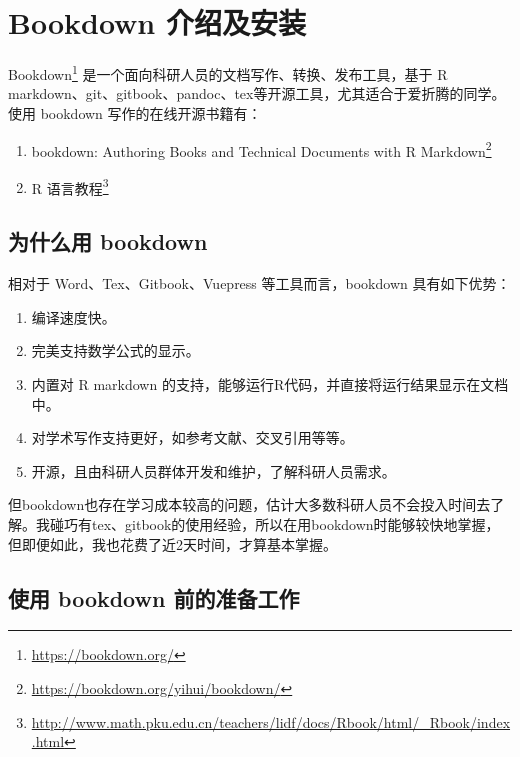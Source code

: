 \documentclass[]{ctexbook}
\providecommand{\tightlist}{%
  \setlength{\itemsep}{0pt}\setlength{\parskip}{0pt}}
\renewcommand{\href}[2]{#2\footnote{\url{#1}}}
\begin{document}
\mainmatter

\hypertarget{intro}{%
\chapter{Bookdown 介绍及安装}\label{intro}}

\href{https://bookdown.org/}{Bookdown} 是一个面向科研人员的文档写作、转换、发布工具，基于 R markdown、git、gitbook、pandoc、tex等开源工具，尤其适合于爱折腾的同学。使用 bookdown 写作的在线开源书籍有：

\begin{enumerate}
\def\labelenumi{\arabic{enumi}.}
\tightlist
\item
  \href{https://bookdown.org/yihui/bookdown/}{bookdown: Authoring Books and Technical Documents with R Markdown}
\item
  \href{http://www.math.pku.edu.cn/teachers/lidf/docs/Rbook/html/_Rbook/index.html}{R 语言教程}
\end{enumerate}

\hypertarget{ux4e3aux4ec0ux4e48ux7528-bookdown}{%
\section{为什么用 bookdown}\label{ux4e3aux4ec0ux4e48ux7528-bookdown}}

相对于 Word、Tex、Gitbook、Vuepress 等工具而言，bookdown 具有如下优势：

\begin{enumerate}
\def\labelenumi{\arabic{enumi}.}
\tightlist
\item
  编译速度快。
\item
  完美支持数学公式的显示。
\item
  内置对 R markdown 的支持，能够运行R代码，并直接将运行结果显示在文档中。
\item
  对学术写作支持更好，如参考文献、交叉引用等等。
\item
  开源，且由科研人员群体开发和维护，了解科研人员需求。
\end{enumerate}

但bookdown也存在学习成本较高的问题，估计大多数科研人员不会投入时间去了解。我碰巧有tex、gitbook的使用经验，所以在用bookdown时能够较快地掌握，但即便如此，我也花费了近2天时间，才算基本掌握。

\hypertarget{ux4f7fux7528-bookdown-ux524dux7684ux51c6ux5907ux5de5ux4f5c}{%
\section{使用 bookdown 前的准备工作}\label{ux4f7fux7528-bookdown-ux524dux7684ux51c6ux5907ux5de5ux4f5c}}
\end{document}
